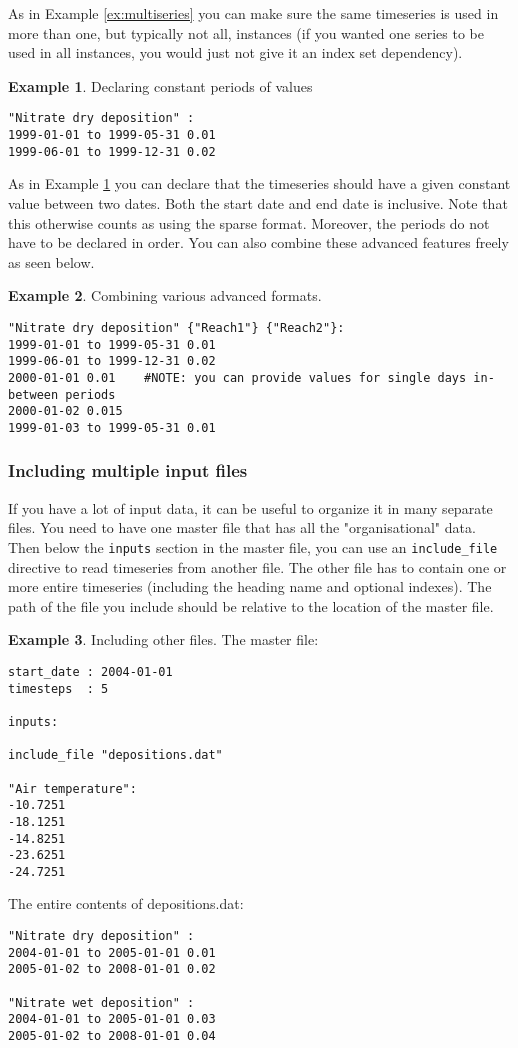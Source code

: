 \documentclass[11pt]{article}
\theoremstyle{definition}
\newtheorem{myexample}{Example}
\newenvironment{example}%
  {\begin{lrbox}{\examplebox}%
   \begin{minipage}{\dimexpr\linewidth-2\fboxsep}
   \begin{myexample}}%
  {\end{myexample}%
   \end{minipage}%
   \end{lrbox}%
   \begin{trivlist}
     \item[]\colorbox{silver}{\usebox\examplebox}
   \end{trivlist}}
\begin{document}
As in Example \ref{ex:multiseries} you can make sure the same timeseries is used in more than one, but typically not all, instances (if you wanted one series to be used in all instances, you would just not give it an index set dependency).

\begin{example}\label{ex:constantperiods}
Declaring constant periods of values
\begin{lstlisting}
"Nitrate dry deposition" :
1999-01-01 to 1999-05-31 0.01
1999-06-01 to 1999-12-31 0.02
\end{lstlisting}
\end{example}

As in Example \ref{ex:constantperiods} you can declare that the timeseries should have a given constant value between two dates. Both the start date and end date is inclusive. Note that this otherwise counts as using the sparse format. Moreover, the periods do not have to be declared in order. You can also combine these advanced features freely as seen below.

\begin{example}
Combining various advanced formats.
\begin{lstlisting}
"Nitrate dry deposition" {"Reach1"} {"Reach2"}:
1999-01-01 to 1999-05-31 0.01
1999-06-01 to 1999-12-31 0.02
2000-01-01 0.01    #NOTE: you can provide values for single days in-between periods
2000-01-02 0.015
1999-01-03 to 1999-05-31 0.01
\end{lstlisting}
\end{example}

\subsubsection{Including multiple input files}

If you have a lot of input data, it can be useful to organize it in many separate files. You need to have one master file that has all the "organisational" data. Then below the {\tt inputs} section in the master file, you can use an {\tt include\_file} directive to read timeseries from another file. The other file has to contain one or more entire timeseries (including the heading name and optional indexes). The path of the file you include should be relative to the location of the master file.

\begin{example}
Including other files. The master file:
\begin{lstlisting}
start_date : 2004-01-01
timesteps  : 5

inputs:

include_file "depositions.dat"

"Air temperature":
-10.7251
-18.1251
-14.8251
-23.6251
-24.7251
\end{lstlisting}
The entire contents of depositions.dat:
\begin{lstlisting}
"Nitrate dry deposition" :
2004-01-01 to 2005-01-01 0.01
2005-01-02 to 2008-01-01 0.02

"Nitrate wet deposition" :
2004-01-01 to 2005-01-01 0.03
2005-01-02 to 2008-01-01 0.04
\end{lstlisting}
\end{example}
\end{document}
